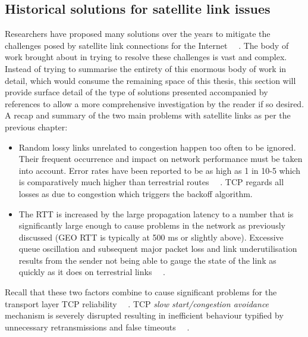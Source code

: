 \subsection{Historical solutions for satellite link issues}

Researchers have proposed many solutions over the years to mitigate the challenges posed by satellite link connections for the Internet ~\cite{7}~\cite{9}. The body of work brought about in trying to resolve these challenges is vast and complex. Instead of trying to summarise the entirety of this enormous body of work in detail, which would consume the remaining space of this thesis, this section will provide surface detail of the type of solutions presented accompanied by references to allow a more comprehensive investigation by the reader if so desired. \\

A recap and summary of the two main problems with satellite links as per the previous chapter:\\

\begin{itemize}

\item Random lossy links unrelated to congestion happen too often to be ignored. Their frequent occurrence and impact on network performance must be taken into account. Error rates have been reported to be as high as 1 in 10-5 which is comparatively much higher than terrestrial routes ~\cite{22}~\cite{25}. TCP regards all losses as due to congestion which triggers the backoff algorithm.

\item The RTT is increased by the large propagation latency to a number that is significantly large enough to cause problems in the network as previously discussed (GEO RTT is typically at 500 ms or slightly above). Excessive queue oscillation and subsequent major packet loss and link underutilisation results from the sender not being able to gauge the state of the link as quickly as it does on terrestrial links ~\cite{7}~\cite{9}.\\

\end{itemize}

Recall that these two factors combine to cause significant problems for the transport layer TCP reliability ~\cite{7}~\cite{9}. TCP \emph{slow start/congestion avoidance} mechanism is severely disrupted resulting in inefficient behaviour typified by unnecessary retransmissions and false timeouts ~\cite{8}~\cite{15}. 

